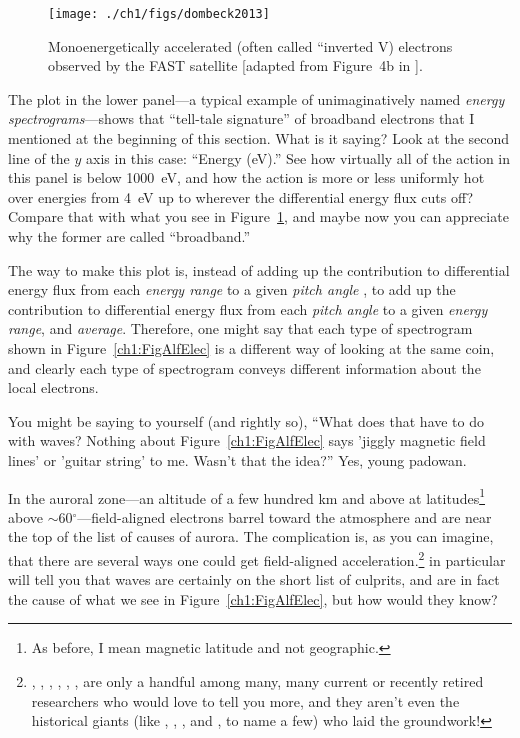 
\begin{figure}
  \centering
  \noindent\texttt{[image: ./ch1/figs/dombeck2013]}
  \caption[Inverted V (monoenergetic) electrons]{Monoenergetically
    accelerated (often called ``inverted V) electrons observed by
    the FAST satellite [adapted from Figure~4b in \citealp{Dombeck2013}].}
  \label{ch1:FigDombeck}
\end{figure}


The plot in the lower panel---a typical example of unimaginatively
named \emph{energy spectrograms}---shows that ``tell-tale signature''
of broadband electrons that I mentioned at the beginning of this
section. What is it saying? Look at the second line of the $y$ axis in
this case: ``Energy (eV).'' See how virtually all of the action in
this panel is below 1000~eV, and how the action is more or less
uniformly hot over energies from 4~eV up to wherever the differential
energy flux cuts off? Compare that with what you see in
Figure~\ref{ch1:FigDombeck}, and maybe now you can appreciate why the
former are called ``broadband.'' 

The way to make this plot is, instead of adding up the contribution to
differential energy flux from each \emph{energy range} to a given
\emph{pitch angle} , to add up the contribution to differential energy
flux from each \emph{pitch angle} to a given \emph{energy range}, and
\emph{average}. Therefore, one might say that each type of spectrogram
shown in Figure~\ref{ch1:FigAlfElec} is a different way of looking at
the same coin, and clearly each type of spectrogram conveys different
information about the local electrons.

You might be saying to yourself (and rightly so), ``What does that
have to do with \Alf waves? Nothing about Figure~\ref{ch1:FigAlfElec}
says 'jiggly magnetic field lines' or 'guitar string' to me. Wasn't
that the idea?'' Yes, young padowan. 

In the auroral zone---an altitude of a few hundred km and above at
latitudes\footnote{As before, I mean magnetic latitude and not
  geographic.}  above $\sim$60$^\circ$---field-aligned electrons
barrel toward the atmosphere and are near the top of the list of
causes of aurora. The complication is, as you can imagine, that there
are several ways one could get field-aligned
acceleration.\footnote{\citet{Wygant2002}, \citet{Bostrom2003a},
  \citet{Morooka2004}, \citet{Newell2009}, \citet{Hull2010},
  \citet{Mottez2016}, are only a handful among many, many current or
  recently retired researchers who would love to tell you more, and
  they aren't even the historical giants (like \citet{Knight1973},
  \citet{Evans1974}, \citet{Hasegawa1976}, and \citet{Lyons1980a}, to
  name a few) who laid the groundwork!}
\citet{Chaston2002,Chaston2003a,Chaston2007,Chaston2008} in particular
will tell you that \Alf waves are certainly on the short list of
culprits, and are in fact the cause of what we see in
Figure~\ref{ch1:FigAlfElec}, but how would they know?


